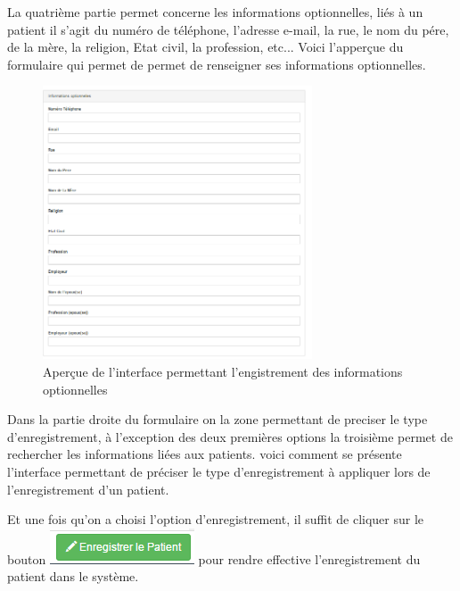\documentclass[12pt,a4paper]{report}
\begin{document}
La quatrième partie permet concerne les informations optionnelles, liés à un patient il s'agit du numéro de téléphone, l'adresse e-mail, la rue, le nom du pére, de la mère, la religion, Etat civil, la profession, etc...
Voici l'apperçue du formulaire qui permet de permet de renseigner ses informations optionnelles.

\begin{figure}[h]
\begin{center}
\includegraphics[width=8cm]{pic/InfoOptionnel.png}
\end{center}
\caption{Aperçue de l'interface permettant l'engistrement des informations optionnelles}
\label{Aperçue de l'interface permettant l'engistrement des informations optionnelles}
\end{figure} 
Dans la partie droite du formulaire on la zone permettant de preciser le type d'enregistrement, à l'exception des deux premières options la troisième permet de rechercher les informations liées aux patients. voici comment se présente l'interface permettant de préciser le type d'enregistrement à appliquer lors de l'enregistrement d'un patient. 

Et une fois qu'on a choisi l'option d'enregistrement, il suffit de cliquer sur le bouton \includegraphics[scale=0.7]{pic/EnregPatient.png} pour rendre effective l'enregistrement du patient dans le système.
\end{document}
